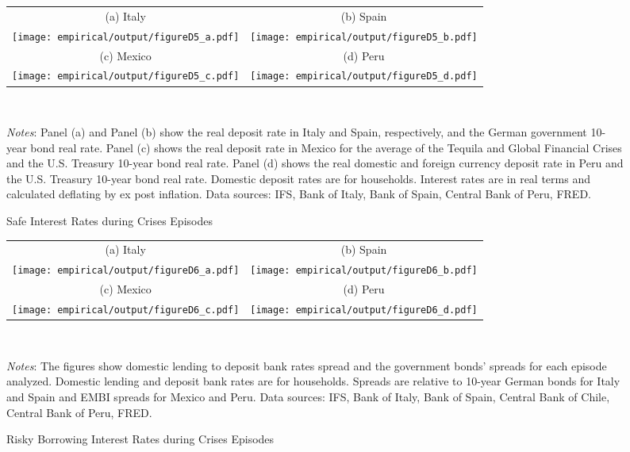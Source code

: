\documentclass[12pt]{article}
\begin{document}
\begin{spacing}{1.5}
\begin{figure}[H]
\caption{Safe Interest Rates during Crises Episodes}
\label{fig:safe_rates}
\begin{tabular}{cc}
{\footnotesize{}{(a) Italy} } & {\footnotesize{}{ (b) Spain} }\\
\texttt{[image: empirical/output/figureD5\_a.pdf]} &
\texttt{[image: empirical/output/figureD5\_b.pdf]}  \\
{\footnotesize{}{(c) Mexico} } & {\footnotesize{}{(d) Peru} } \\
\texttt{[image: empirical/output/figureD5\_c.pdf]} &
\texttt{[image: empirical/output/figureD5\_d.pdf]}  \\
\end{tabular}
\\ \raggedright{}\textit{\footnotesize{}Notes}{: \footnotesize{{\color{black}Panel (a) and Panel (b) show the real deposit rate in Italy and Spain, respectively, and the German government 10-year bond real rate.
Panel (c) shows the real deposit rate in Mexico for the average of the Tequila and Global Financial Crises and the U.S.  Treasury 10-year bond real rate.  Panel (d)  shows the real domestic and foreign currency deposit rate in Peru and the U.S.  Treasury 10-year bond real rate. Domestic deposit rates are for households.  Interest rates are in real terms and calculated deflating by ex post inflation.  Data sources: IFS, Bank of Italy,  Bank of Spain,  Central Bank of Peru,  FRED.}}}{\footnotesize\par}
\end{figure}

\begin{figure}[H]
\caption{Risky Borrowing Interest Rates during Crises Episodes}
\label{fig:borrowing_rates}
\begin{tabular}{cc}
{\footnotesize{}{(a) Italy} } & {\footnotesize{}{ (b) Spain} }\\
\texttt{[image: empirical/output/figureD6\_a.pdf]} &
\texttt{[image: empirical/output/figureD6\_b.pdf]}  \\
{\footnotesize{}{(c) Mexico} } & {\footnotesize{}{(d) Peru} } \\
\texttt{[image: empirical/output/figureD6\_c.pdf]} &
\texttt{[image: empirical/output/figureD6\_d.pdf]}  \\
\end{tabular}
\\ \raggedright{}\textit{\footnotesize{}Notes}{: \footnotesize{{\color{black}The figures show  domestic lending to deposit bank rates spread and the government bonds' spreads for each episode analyzed.  Domestic lending and deposit bank rates are for households. Spreads are relative to 10-year German bonds for Italy and Spain and EMBI spreads for Mexico and Peru.  Data sources: IFS, Bank of Italy,  Bank of Spain,  Central Bank of Chile,  Central Bank of Peru, FRED.}}}{\footnotesize\par}


\end{figure}
\end{spacing}
\end{document}
